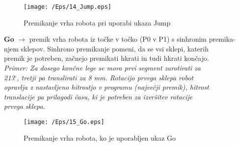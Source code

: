 \begin{figure}[h]
    \center
    \texttt{[image: /Eps/14\_Jump.eps]}
    \vspace{-0.3cm}
    \caption{Premikanje vrha robota pri uporabi ukaza Jump}
    \label{fJump}
\end{figure}

\begin{mdframed}[backgroundcolor=green!20, shadow=true,roundcorner=8pt]
        \vspace{0.2cm}
\textbf{Go} $\longrightarrow$ premik vrha robota iz točke v točko (P0 v P1) s sinhronim premika- \\ %
\hspace*{1.2cm} njem sklepov. Sinhrono  premikanje pomeni, da se vsi sklepi, katerih \\ %
\hspace*{1.2cm} premik je potreben, začnejo premikati hkrati in tudi hkrati končajo. \vspace*{0.3cm}\\ %
\hspace*{1.2cm} \emph{Primer: Za dosego končne lege se mora prvi segment  zarotirati za} \\ %
\hspace*{1.2cm} \emph{213$^\circ$, tretji pa translirati za 8 mm. Rotacijo prvega sklepa robot} \\ %
\hspace*{1.2cm} \emph{opravlja z nastavljeno hitrostjo v programu (največji premik), hitrost} \\ %
\hspace*{1.2cm} \emph{translacije pa prilagodi času, ki je potreben za izvršitev rotacije} \\ %
\hspace*{1.2cm} \emph{prvega sklepa.}  %
        \vspace{0.2cm}
\end{mdframed}

\begin{figure}[h]
    \center
    \texttt{[image: /Eps/15\_Go.eps]}
    \vspace{-0.3cm}
    \caption{Premikanje vrha robota, ko je uporabljen ukaz Go}
    \label{fJump}
\end{figure}

